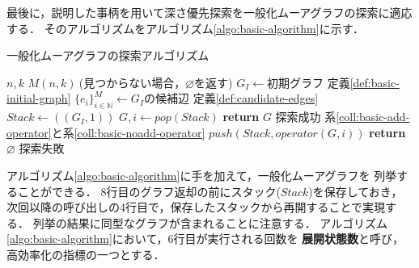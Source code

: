 最後に，説明した事柄を用いて深さ優先探索を一般化ムーアグラフの探索に適応する．
そのアルゴリズムをアルゴリズム\ref{algo:basic-algorithm}に示す．
\begin{algorithm}[H]
  \caption{一般化ムーアグラフの探索アルゴリズム}
  \label{algo:basic-algorithm}
  \begin{algorithmic}[1]
    \Require $n,k$
    \Ensure $M(n,k)\:$(見つからない場合，$\varnothing$を返す)
    \State $G_I\gets\text{初期グラフ}$
    \Comment 定義\ref{def:basic-initial-graph}
    \State $\{e_i\}_{i\in\mathbb{N}}^M\gets G_I\text{の候補辺}$
    \Comment 定義\ref{def:candidate-edges}
    \State $Stack\gets((G_I,1))$
    \State $G,i\gets pop(Stack)$
    \State \textbf{return} $G$
    \Comment 探索成功
    \EndIf
    \Comment 系\ref{coll:basic-add-operator}と系\ref{coll:basic-noadd-operator}
    \State $push(Stack,operator(G,i))$
    \EndIf
    \EndFor
    \EndWhile
    \State \textbf{return} $\varnothing$
    \Comment 探索失敗
    \EndProcedure
  \end{algorithmic}
\end{algorithm}
アルゴリズム\ref{algo:basic-algorithm}に手を加えて，一般化ムーアグラフを
列挙することができる．
8行目のグラフ返却の前にスタック($Stack$)を保存しておき，
次回以降の呼び出しの4行目で，保存したスタックから再開することで実現する．
列挙の結果に同型なグラフが含まれることに注意する．
アルゴリズム\ref{algo:basic-algorithm}において，6行目が実行される回数を
\textbf{展開状態数}と呼び，高効率化の指標の一つとする．

